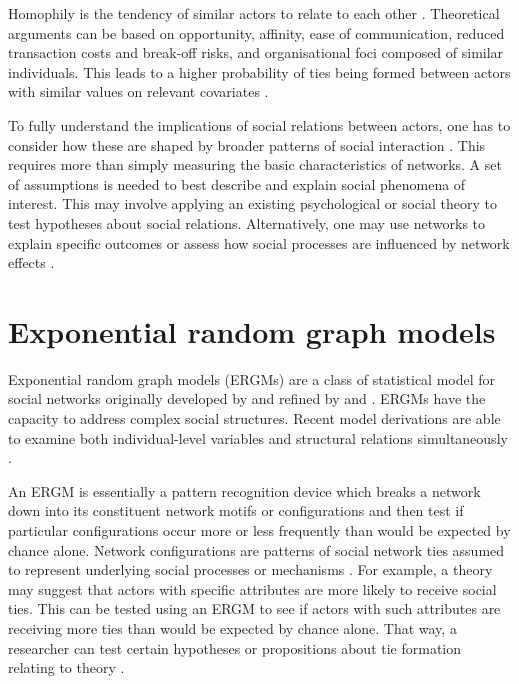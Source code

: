 Homophily is the tendency of similar actors to relate to each other \citep{mcpherson2001birds}. Theoretical arguments can be based on opportunity, affinity, ease of communication, reduced transaction costs and break-off risks, and organisational foci composed of similar individuals. This leads to a higher probability of ties being formed between actors with similar values on relevant covariates \citep{snijders2011statistical}.

To fully understand the implications of social relations between actors, one has to consider how these are shaped by broader patterns of social interaction \citep{scott2011sage}. This requires more than simply measuring the basic characteristics of networks. A set of assumptions is needed to best describe and explain social phenomena of interest. This may involve applying an existing psychological or social theory to test hypotheses about social relations. Alternatively, one may use networks to explain specific outcomes or assess how social processes are influenced by network effects \citep{scott2011sage,borgatti2013analyzing}. \medskip

\section{Exponential random graph models}

Exponential random graph models (ERGMs) are a class of statistical model for social networks originally developed by \citet{frank1986markov} and refined by \citet{wasserman1996logit} and \citet{pattison1999logit}. ERGMs have the capacity to address complex social structures. Recent model derivations are able to examine both individual-level variables and structural relations simultaneously \citep{robins2007recent}. \medskip

An ERGM is essentially a pattern recognition device which breaks a network down into its constituent network motifs or configurations and then test if particular configurations occur more or less frequently than would be expected by chance alone. Network configurations are patterns of social network ties assumed to represent underlying social processes or mechanisms \citep{lusher2014cooperative}. For example, a theory may suggest that actors with specific attributes are more likely to receive social ties. This can be tested using an ERGM to see if actors with such attributes are receiving more ties than would be expected by chance alone. That way, a researcher can test certain hypotheses or propositions about tie formation relating to theory \citep{robins2007recent}. \medskip

